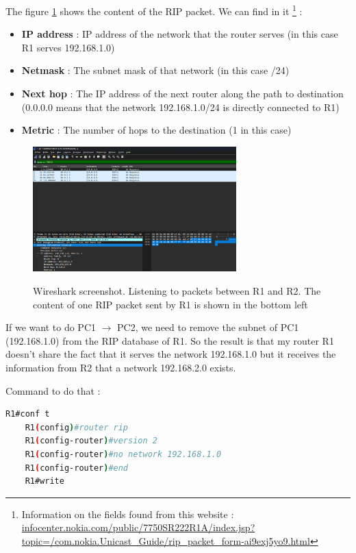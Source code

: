 \documentclass[10pt,a4paper]{ULBreport}
\begin{document}
The figure \ref{ripinfo} shows the content of the RIP packet. We can find in it \footnote{Information on the fields found from this website : \url{infocenter.nokia.com/public/7750SR222R1A/index.jsp?topic=/com.nokia.Unicast_Guide/rip_packet_form-ai9exj5yo9.html}} :

\begin{itemize}
    \item \textbf{IP address} : IP address of the network that the router serves (in this case R1 serves 192.168.1.0) 
    \item \textbf{Netmask} : The subnet mask of that network (in this case /24)
    \item \textbf{Next hop} : The IP address of the next router along the path to destination (0.0.0.0 means that the network 192.168.1.0/24 is directly connected to R1)
    \item \textbf{Metric} : The number of hops to the destination (1 in this case)
\end{itemize}

\begin{figure}[H]
    \caption{Wireshark screenshot. Listening to packets between R1 and R2. The content of one RIP packet sent by R1 is shown in the bottom left}
    \center
    \includegraphics[width=0.7\textwidth]{RIPInfo.png}
    \label{ripinfo}
\end{figure}





If we want to do PC1 $\rightarrow$ PC2, we need to remove the subnet of PC1 (192.168.1.0) from the RIP database of R1. So the result is that my router R1 doesn't share the fact that it serves the network 192.168.1.0 but it receives the information from R2 that a network 192.168.2.0 exists. 

Command to do that :

\begin{lstlisting}[language=bash]
    R1#conf t
    R1(config)#router rip
    R1(config-router)#version 2
    R1(config-router)#no network 192.168.1.0
    R1(config-router)#end
    R1#write    
\end{lstlisting}
\end{document}
